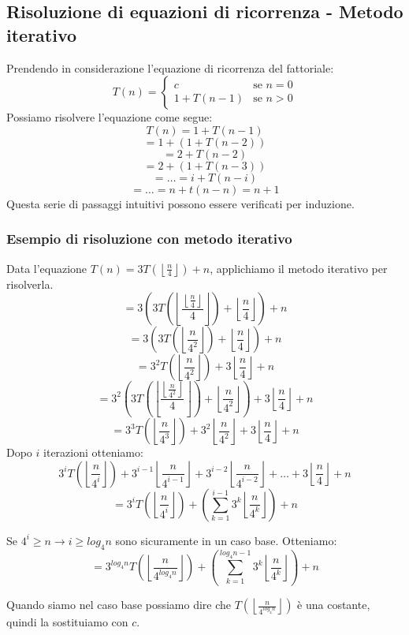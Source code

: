 \documentclass[a4paper,12pt,twoside]{report}
\newcommand\floor[1]{\left\lfloor#1\right\rfloor}
\begin{document}
\subsection{Risoluzione di equazioni di ricorrenza - Metodo iterativo}
Prendendo in considerazione l'equazione di ricorrenza del fattoriale:
\begin{equation}
T(n) = 
\begin{cases}
c & \text{se $n = 0$} \\
1 + T(n-1) & \text{se $n > 0$}
\end{cases}
\end{equation}
Possiamo risolvere l'equazione come segue:
\[ T(n) = 1 + T(n-1) \]
\[ = 1 + (1 + T(n-2)) \]
\[ = 2 + T(n-2) \]
\[ = 2 + (1 + T(n-3)) \]
\[ = \dots = i + T(n-i) \]
\[= \dots = n + t(n-n) = n + 1 \]
Questa serie di passaggi intuitivi possono essere verificati per induzione.
\subsubsection{Esempio di risoluzione con metodo iterativo}
Data l'equazione $ T(n) = 3T(\floor{\frac{n}{4}}) + n $, applichiamo il metodo
iterativo per risolverla.
\[= 3\left(3T\left(\floor{\frac{\floor{\frac{n}{4}}}{4}} \right)+\floor{\frac{n}{4}}\right) + n\]
\[ = 3\left(3T\left(\floor{\frac{n}{4^2}}\right) + \floor{\frac{n}{4}}\right) + n \]
\[ = 3^2 T\left(\floor{\frac{n}{4^2}}\right) + 3 \floor{\frac{n}{4}} + n \]
\[ = 3^2\left(3T\left(\floor{\frac{\floor{\frac{n}{4^2}}}{4}}\right) + \floor{\frac{n}{4^2}}\right) + 3 \floor{\frac{n}{4}} + n \]
\[ = 3^3T\left( \floor{\frac{n}{4^3}}\right) + 3^2\floor{\frac{n}{4^2}} + 3\floor{\frac{n}{4}} + n \]
Dopo $i$ iterazioni otteniamo:
\[ 3^i T\left(\floor{\frac{n}{4^i}}\right)+3^{i-1}\floor{\frac{n}{4^{i-1}}} + 3^{i-2} \floor{\frac{n}{4^{i-2}}} + \dots + 3\floor{\frac{n}{4}} + n \]
\[ = 3^{i} T\left(\floor{\frac{n}{4^{i}}}\right) + \left(\sum_{k=1}^{i-1} 3^k \floor{\frac{n}{4^k}} \right) + n \]


Se $4^i \ge n \rightarrow i \ge log_{4}{n}$ sono sicuramente in un caso base.
\newline
Otteniamo:
\[ = 3^{log_{4}{n}} T\left(\floor{\frac{n}{4^{log_{4}{n}}}}\right) + \left(\sum_{k=1}^{log_{4}{n}-1} 3^k \floor{\frac{n}{4^k}} \right) + n \]

Quando siamo nel caso base possiamo dire che $T\left(\floor{\frac{n}{4^{log_{4}{n}}}}\right)$ \`{e} una costante, quindi la sostituiamo con $c$.
\end{document}
